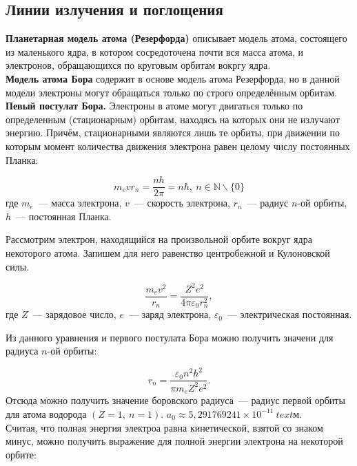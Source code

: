 \subsection{Линии излучения и поглощения}

\textbf{Планетарная модель атома (Резерфорда)} описывает модель атома, состоящего из маленького ядра, в котором сосредоточена почти вся масса атома, и электронов, обращающихся по круговым орбитам вокргу ядра. \\

\textbf{Модель атома Бора} содержит в основе модель атома Резерфорда, но в данной модели электроны могут обращаться только по строго определённым орбитам.\\

\textbf{Певый постулат Бора.} Электроны в атоме могут двигаться только по определенным (стационарным) орбитам, находясь на которых они не излучают энергию.  Причём, стационарными являются лишь те орбиты, при движении по которым момент количества движения электрона равен целому числу постоянных Планка:

\begin{equation}
	m_e v r_n = \frac{n h}{2 \pi} = n \hbar,~n \in \mathbb{N} \backslash \lbrace 0 \rbrace
\end{equation}
где $m_e$~--- масса электрона, $v$~--- скорость электрона, $r_n$~--- радиус $n$-ой орбиты, $h$~--- постоянная Планка.

Рассмотрим электрон, находящийся на произвольной орбите вокруг ядра некоторого атома. Запишем для него равенство центробежной и Кулоновской силы.

\begin{equation}
	\frac{m_e v^2}{r_n} = \frac{Z^2 e^2}{4 \pi \varepsilon_0 r_n^2},
\end{equation}
где $Z$~--- зарядовое число, $e$~--- заряд электрона, $\varepsilon_0$~--- электрическая постоянная.

Из данного уравнения и первого постулата Бора можно получить значени для радиуса $n$-ой орбиты:

\begin{equation}
	r_n = \frac{\varepsilon_0 n^2 h^2}{\pi m_e Z^2 e^2}.
\end{equation}
Отсюда можно получить значение боровского радиуса~--- радиус первой орбиты для атома водорода $(Z = 1,~n = 1)$. $a_0 \approx 5,291769241 \times 10^{-11}~text{м}$. \\

Считая, что полная энергия электроа равна кинетической, взятой со знаком минус, можно получить выражение для полной энергии электрона на некоторой орбите:

